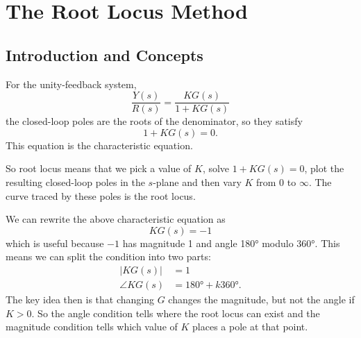 
\section{The Root Locus Method}

\subsection{Introduction and Concepts}
For the unity-feedback system,
\begin{equation*}
  \frac{Y(s)}{R(s)} = \frac{KG(s)}{1 + KG(s)}
\end{equation*}
the closed-loop poles are the roots of the denominator, so they satisfy
\begin{equation*}
  1 + KG(s) = 0
.\end{equation*}
This equation is the characteristic equation.

So root locus means that we pick a value of $K$, solve $1 + KG(s) = 0$, plot the resulting closed-loop poles in the $s$-plane and then vary $K$ from 0 to $\infty$.
The curve traced by these poles is the root locus.

We can rewrite the above characteristic equation as
\begin{equation*}
  KG(s) = -1
\end{equation*}
which is useful because $-1$ has magnitude 1 and angle \ang{180} modulo \ang{360}.
This means we can split the condition into two parts:
\begin{align*}
  \left| KG(s) \right| &= 1 \\
  \angle KG(s) &= \ang{180} + k \ang{360} 
.\end{align*}
The key idea then is that changing $G$ changes the magnitude, but not the angle if $K > 0$.
So the angle condition tells where the root locus can exist and the magnitude condition tells which value of $K$ places a pole at that point.


